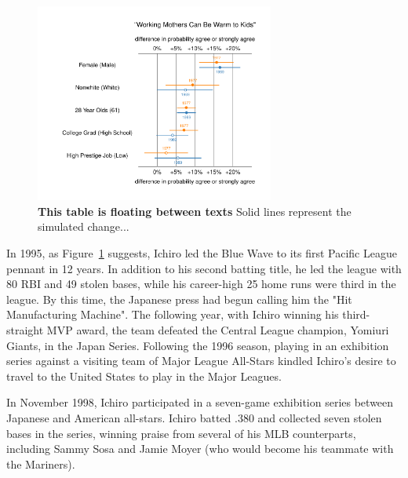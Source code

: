 \documentclass[12pt]{article}
\theoremstyle{hypotheses}
\begin{document}
\begin{figure}[H] %
  \begin{center}
      \includegraphics[width=0.7\textwidth]{plots/mothersFD7789.pdf} 
      \vspace{-2.5em}
      \caption{\textbf{This table is floating between texts} Solid lines represent the simulated change...}
      \label{fig:FloatingPlot}
  \end{center}
\end{figure} 



In 1995, as Figure~\ref{fig:FloatingPlot} suggests, Ichiro led the Blue Wave to its first Pacific League pennant in 12 years. In addition to his second batting title, he led the league with 80 RBI and 49 stolen bases, while his career-high 25 home runs were third in the league. By this time, the Japanese press had begun calling him the "Hit Manufacturing Machine". The following year, with Ichiro winning his third-straight MVP award, the team defeated the Central League champion, Yomiuri Giants, in the Japan Series. Following the 1996 season, playing in an exhibition series against a visiting team of Major League All-Stars kindled Ichiro's desire to travel to the United States to play in the Major Leagues.

In November 1998, Ichiro participated in a seven-game exhibition series between Japanese and American all-stars. Ichiro batted .380 and collected seven stolen bases in the series, winning praise from several of his MLB counterparts, including Sammy Sosa and Jamie Moyer (who would become his teammate with the Mariners).
\end{document}
